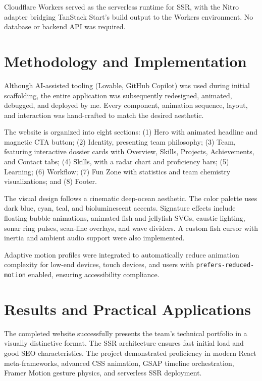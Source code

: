 \documentclass{book}
\begin{document}
\par\noindent Cloudflare Workers served as the serverless runtime for SSR, with the Nitro adapter bridging TanStack Start's build output to the Workers environment. No database or backend API was required.

\section{Methodology and Implementation}

\par\noindent Although AI-assisted tooling (Lovable, GitHub Copilot) was used during initial scaffolding, the entire application was subsequently redesigned, animated, debugged, and deployed by me. Every component, animation sequence, layout, and interaction was hand-crafted to match the desired aesthetic.

\par\noindent The website is organized into eight sections: (1) Hero with animated headline and magnetic CTA button; (2) Identity, presenting team philosophy; (3) Team, featuring interactive dossier cards with Overview, Skills, Projects, Achievements, and Contact tabs; (4) Skills, with a radar chart and proficiency bars; (5) Learning; (6) Workflow; (7) Fun Zone with statistics and team chemistry visualizations; and (8) Footer.

\par\noindent The visual design follows a cinematic deep-ocean aesthetic. The color palette uses dark blue, cyan, teal, and bioluminescent accents. Signature effects include floating bubble animations, animated fish and jellyfish SVGs, caustic lighting, sonar ring pulses, scan-line overlays, and wave dividers. A custom fish cursor with inertia and ambient audio support were also implemented.

\par\noindent Adaptive motion profiles were integrated to automatically reduce animation complexity for low-end devices, touch devices, and users with \texttt{prefers-reduced-motion} enabled, ensuring accessibility compliance.

\section{Results and Practical Applications}

\par\noindent The completed website successfully presents the team's technical portfolio in a visually distinctive format. The SSR architecture ensures fast initial load and good SEO characteristics. The project demonstrated proficiency in modern React meta-frameworks, advanced CSS animation, GSAP timeline orchestration, Framer Motion gesture physics, and serverless SSR deployment.
\end{document}
